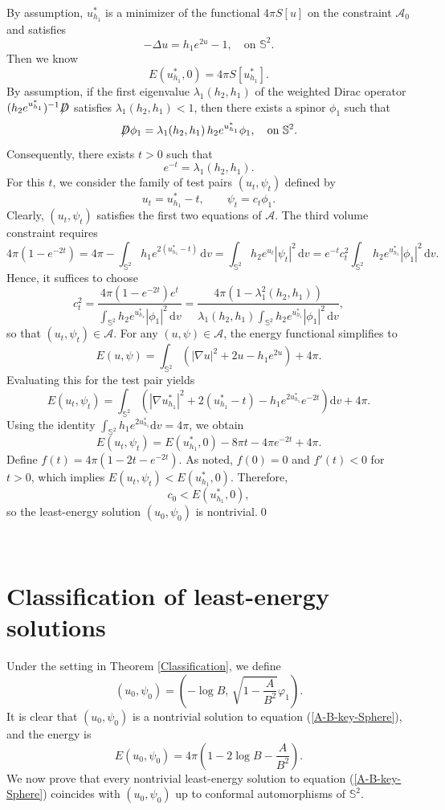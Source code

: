 \documentclass[a4paper, 12pt]{article}
\def\slashiii#1{\setbox0=\hbox{$#1$}#1\hskip-\wd0\hbox to\wd0{\hss\sl/\/\hss}}
\begin{document}
By assumption, \(u^*_{h_1}\) is a minimizer of the functional \(4\pi S[u]\) on the constraint \(\mathcal{A}_0\) and satisfies
\[
-\Delta u = h_1 e^{2u} - 1, \quad \text{on } \mathbb{S}^2.
\]
Then we know
\[E\left( {u_{{h_1}}^*,0} \right) = 4\pi S\left[ {u_{{h_1}}^*} \right] .\]
By assumption, if the first eigenvalue \(\lambda_1(h_2, h_1)\) of the weighted Dirac operator \((h_2 e^{u^*_{h_1}})^{-1} \slashiii{D}\) satisfies \(\lambda_1(h_2, h_1) < 1\), then there exists a spinor \(\phi_1\) such that
\[
\slashiii{D}\phi_1 = \lambda_1(h_2, h_1) \, h_2 e^{u^*_{h_1}} \phi_1, \quad \text{on } \mathbb{S}^2.
\]
Consequently, there exists \(t > 0\) such that
\[
e^{-t} = \lambda_1(h_2, h_1).
\]
For this \(t\), we consider the family of test pairs \((u_t, \psi_t)\) defined by
\[
u_t = u^*_{h_1} - t, \qquad \psi_t = c_t \phi_1.
\]
Clearly, \((u_t, \psi_t)\) satisfies the first two equations of \(\mathcal{A}\). The third volume constraint requires
\[
4\pi(1 - e^{-2t}) = 4\pi - \int_{\mathbb{S}^2} h_1 e^{2(u^*_{h_1}-t)} \, \text{d}v = \int_{\mathbb{S}^2} h_2 e^{u_t} |\psi_t|^2 \, \text{d}v = e^{-t} c^2_t \int_{\mathbb{S}^2} h_2 e^{u^*_{h_1}} |\phi_1|^2 \, \text{d}v.
\]
Hence, it suffices to choose
\[
c^2_t = \frac{4\pi(1 - e^{-2t}) e^{t}}{\int_{\mathbb{S}^2} h_2 e^{u^*_{h_1}} |\phi_1|^2 \, \text{d}v} = \frac{4\pi(1 - \lambda_1^2(h_2, h_1))}{\lambda_1(h_2, h_1) \int_{\mathbb{S}^2} h_2 e^{u^*_{h_1}} |\phi_1|^2 \, \text{d}v},
\]
so that \((u_t, \psi_t) \in \mathcal{A}\). For any \((u, \psi) \in \mathcal{A}\), the energy functional simplifies to
\[
E(u, \psi) = \int_{\mathbb{S}^2} \left( |\nabla u|^2 + 2u - h_1 e^{2u} \right) + 4\pi.
\]
Evaluating this for the test pair yields
\[
E(u_t, \psi_t) = \int_{\mathbb{S}^2} \left( |\nabla u^*_{h_1}|^2 + 2(u^*_{h_1} - t) - h_1 e^{2u^*_{h_1}} e^{-2t} \right) \text{d}v + 4\pi.
\]
Using the identity ${\int_{{\mathbb{S}^2}} {{h_1}{e^{2u^*_{h_1}}}} {\text{d}}v = 4\pi }$, we obtain
\[
E(u_t, \psi_t) = E(u^*_{h_1}, 0) - 8\pi t - 4\pi e^{-2t} + 4\pi.
\]
Define \(f(t) = 4\pi(1 - 2t - e^{-2t})\). As noted, \(f(0) = 0\) and \(f'(t) < 0\) for \(t > 0\), which implies \(E(u_t, \psi_t) < E(u^*_{h_1}, 0)\). Therefore,
\[
c_0 < E(u^*_{h_1}, 0),
\]
so the least-energy solution $\left( u_0,\psi_0\right) $ is nontrivial.\qed

\


\section{Classification of least-energy solutions}
Under the setting in Theorem \ref{Classification}, we define
\[
(u_0,\psi_0)=\left(-\log B,\,\sqrt{1-\frac{A}{B^2}}\varphi_1\right).
\]
It is clear that  \((u_0,\psi_0)\) is a nontrivial solution to equation (\ref{A-B-key-Sphere}), and the energy is
\[
E(u_0,\psi_0)
=4\pi\left(1-2\log B-\frac{A}{B^2}
\right).
\]
We now prove that every nontrivial least-energy solution to equation (\ref{A-B-key-Sphere}) coincides with $(u_0,\psi_0)$ up to conformal automorphisms of \(\mathbb{S}^2\).
\end{document}

